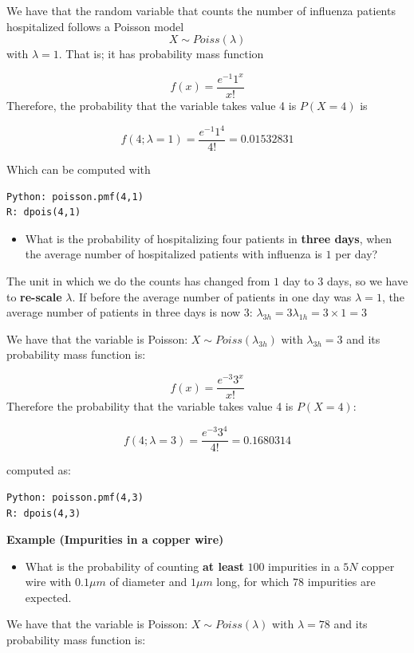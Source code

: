 \documentclass[
]{book}
\providecommand{\tightlist}{%
  \setlength{\itemsep}{0pt}\setlength{\parskip}{0pt}}
\begin{document}
We have that the random variable that counts the number of influenza patients hospitalized follows a Poisson model \[X \sim Poiss(\lambda)\] with \(\lambda=1\). That is; it has probability mass function

\[f(x)= \frac{e^{-1}1^x}{x!}\]
Therefore, the probability that the variable takes value 4 is \(P(X=4)\) is

\[f(4; \lambda=1)= \frac{e^{-1}1^4}{4!}=0.01532831\]

Which can be computed with

\begin{verbatim}
Python: poisson.pmf(4,1)
R: dpois(4,1)
\end{verbatim}

\begin{itemize}
\tightlist
\item
  What is the probability of hospitalizing four patients in \textbf{three days}, when the average number of hospitalized patients with influenza is \(1\) per day?
\end{itemize}

The unit in which we do the counts has changed from \(1\) day to \(3\) days, so we have to \textbf{re-scale} \(\lambda\). If before the average number of patients in one day was \(\lambda=1\), the average number of patients in three days is now 3: \(\lambda_{3h}=3\lambda_{1h}=3\times 1=3\)

We have that the variable is Poisson: \(X \sim Poiss(\lambda_{3h})\) with \(\lambda_{3h}=3\) and its probability mass function is:

\[f(x)= \frac{e^{-3}3^x}{x!}\]
Therefore the probability that the variable takes value 4 is \(P(X=4)\):

\[f(4; \lambda=3)= \frac{e^{-3}3^4}{4!}=0.1680314\]

computed as:

\begin{verbatim}
Python: poisson.pmf(4,3)
R: dpois(4,3)
\end{verbatim}

\textbf{Example (Impurities in a copper wire)}

\begin{itemize}
\tightlist
\item
  What is the probability of counting \textbf{at least} \(100\) impurities in a \(5N\) copper wire with \(0.1\mu m\) of diameter and \(1\mu m\) long, for which \(78\) impurities are expected.
\end{itemize}

We have that the variable is Poisson: \(X \sim Poiss(\lambda)\) with \(\lambda=78\) and its probability mass function is:
\end{document}
